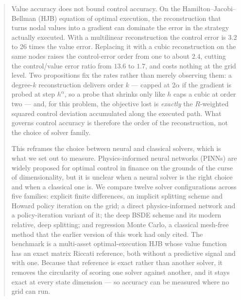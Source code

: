 \documentclass[conference]{IEEEtran}
\begin{document}
\begin{abstract}
Value accuracy does not bound control accuracy. On the Hamilton--Jacobi--Bellman (HJB) equation of
optimal execution, the reconstruction that turns
nodal values into a gradient can dominate the error in the strategy actually executed. With a
multilinear reconstruction the control error is 3.2 to 26 times the value error. Replacing it with a
cubic reconstruction on the same nodes raises the control-error order from one to about $2.4$,
cutting the control/value error ratio from $13.6$ to $1.7$, and costs nothing at the grid level.
Two propositions fix the rates rather than merely observing them: a degree-$k$ reconstruction
delivers order $k$ --- capped at $2\alpha$ if the gradient is probed at step $h^{\alpha}$, so a
probe that shrinks only like $h$ caps a cubic at order two --- and, for this problem, the objective
lost is \emph{exactly} the $R$-weighted squared control deviation accumulated along the executed
path.
What governs control accuracy is therefore the order of the
reconstruction, not the choice of solver family.

This reframes the choice between neural and classical solvers, which is what we set out to measure.
Physics-informed neural networks (PINNs) are widely proposed for optimal control in finance on the
grounds of the curse of dimensionality, but it is unclear when a neural solver is the right choice
and when a classical one is. We compare twelve solver configurations across five families: explicit
finite differences, an implicit splitting scheme and Howard policy iteration on the grid; a direct
physics-informed network and a policy-iteration variant of it; the deep BSDE scheme and its modern
relative, deep splitting; and regression Monte Carlo, a classical mesh-free method that the earlier
version of this work had only cited.
The benchmark is a multi-asset optimal-execution HJB whose value function has an exact matrix Riccati
reference, both without a predictive signal and with one. Because that reference is exact rather than
another solver, it removes the circularity of scoring one solver against another, and it stays exact
at every state dimension --- so accuracy can be measured where no grid can run.


\end{abstract}
\end{document}
